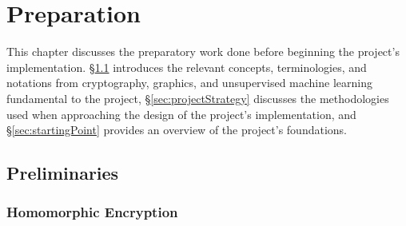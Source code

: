 \chapter{Preparation}
\label{chap:preparation}
\indent \indent
This chapter discusses the preparatory work done before beginning the project's implementation. §\ref{sec:preliminaries} introduces the relevant concepts, terminologies, and notations from cryptography, graphics, and unsupervised machine learning fundamental to the project, §\ref{sec:projectStrategy} discusses the methodologies used when approaching the design of the project's implementation, and §\ref{sec:startingPoint} provides an overview of the project's foundations.
\section{Preliminaries}
\label{sec:preliminaries}
\subsection{Homomorphic Encryption}
\label{sec:homomorphicEncryption}
